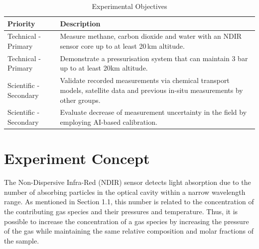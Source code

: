 \documentclass[ %
  a4paper, %
  11pt, %
  openany, %
  parskip, %
  toc=totoc, %
  listof=totoc, %
  bibliography=totoc %
]{scrreprt} %
\providecommand{\DIFaddbeginFL}{} %
\providecommand{\DIFaddendFL}{} %
\providecommand{\DIFdelbeginFL}{} %
\providecommand{\DIFdelendFL}{} %
\providecommand{\DIFscaledelfig}{0.5}
\newlength{\DIFdelgraphicswidth} %
\newlength{\DIFdelgraphicsheight} %
\providecommand{\DIFaddincludegraphics}[2][]{{\color{blue}\fbox{\DIFOincludegraphics[#1]{#2}}}} %
\providecommand{\DIFdelincludegraphics}[2][]{%
\sbox{\DIFdelgraphicsbox}{\DIFOincludegraphics[#1]{#2}}%
\settoboxwidth{\DIFdelgraphicswidth}{\DIFdelgraphicsbox} %
\settoboxtotalheight{\DIFdelgraphicsheight}{\DIFdelgraphicsbox} %
\scalebox{\DIFscaledelfig}{%
\parbox[b]{\DIFdelgraphicswidth}{\usebox{\DIFdelgraphicsbox}\\[-\baselineskip] \rule{\DIFdelgraphicswidth}{0em}}\llap{\resizebox{\DIFdelgraphicswidth}{\DIFdelgraphicsheight}{%
\setlength{\unitlength}{\DIFdelgraphicswidth}%
\begin{picture}(1,1)%
\thicklines\linethickness{2pt} %
{\color[rgb]{1,0,0}\put(0,0){\framebox(1,1){}}}%
{\color[rgb]{1,0,0}\put(0,0){\line( 1,1){1}}}%
{\color[rgb]{1,0,0}\put(0,1){\line(1,-1){1}}}%
\end{picture}%
}\hspace*{3pt}}} %
} %
\DeclareRobustCommand{\DIFaddbeginFL}{\DIFOaddbeginFL \let\includegraphics\DIFaddincludegraphics} %
\DeclareRobustCommand{\DIFaddendFL}{\DIFOaddendFL \let\includegraphics\DIFOincludegraphics} %
\DeclareRobustCommand{\DIFdelbeginFL}{\DIFOdelbeginFL \let\includegraphics\DIFdelincludegraphics} %
\DeclareRobustCommand{\DIFdelendFL}{\DIFOaddendFL \let\includegraphics\DIFOincludegraphics} %
\begin{document}
\begin{table}[H]
\centering
\caption{Experimental Objectives}
\label{tab:objectives}
\DIFdelbeginFL %
\DIFdelendFL \DIFaddbeginFL \begin{tabularx}{0.9\textwidth}{lX}
\toprule
\textbf{Priority} & \textbf{Description} \\
\midrule
Technical - Primary & Measure methane, carbon dioxide and water with an NDIR sensor core up to at least 20\,km altitude.\\
Technical - Primary & Demonstrate a pressurisation system that can maintain 3 bar up to at least 20km altitude.\\
Scientific - Secondary & Validate recorded measurements via chemical transport models, satellite data and previous in-situ measurements by other groups.\\
Scientific - Secondary & Evaluate decrease of measurement uncertainty in the field by employing AI-based calibration.\\
\bottomrule
\end{tabularx}
\DIFaddendFL \end{table}

\section{Experiment Concept}

The Non-Dispersive Infra-Red (NDIR) sensor detects light absorption due to the number of absorbing particles in the optical cavity within a narrow wavelength range.
As mentioned in Section 1.1, this number is related to the concentration of the contributing gas species and their pressures and temperature.
Thus, it is possible to increase the concentration of a gas species by increasing the pressure of the gas while maintaining the same relative composition and molar fractions of the sample.
\end{document}

